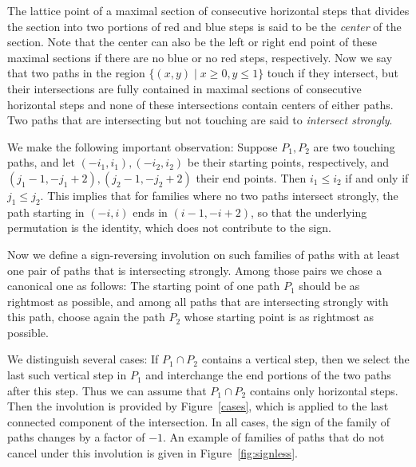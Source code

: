 \documentclass[12pt]{amsart}
\theoremstyle{definition}
\numberwithin{equation}{section}
\begin{document}
The lattice point of a maximal section of consecutive horizontal steps that divides the section into two portions of red and blue steps is said to be the \emph{center} of the section. Note that the center can also be the left or right end point of these maximal sections if there are no blue or no red steps, respectively. Now we say that two paths in the region $\{(x,y) \mid  x \ge 0 , y \le 1\}$ touch if they intersect, but their intersections are fully contained in maximal sections of consecutive horizontal steps and none of these intersections contain centers of either paths. Two paths that are intersecting but not touching are said to \emph{intersect strongly}. 

We make the following important observation: Suppose $P_1,P_2$ are two touching paths, and let 
$(-i_1,i_1),(-i_2,i_2)$ be their starting points, respectively, and $(j_1-1,-j_1+2),(j_2-1,-j_2+2)$ their end points. Then $i_1 \le i_2$ if and only if 
$j_1 \le j_2$. This implies that for families where no two paths intersect strongly, the path starting in 
$(-i,i)$ ends in $(i-1,-i+2)$, so that the underlying permutation is the identity, which does not contribute to the sign.

Now we define a sign-reversing involution on such families of paths with at least one pair of paths that is 
intersecting strongly. Among those pairs we chose a canonical one as follows: The starting point of one path $P_1$ should be as rightmost as possible, and among all paths that are intersecting strongly with this path, choose again the path $P_2$ whose starting point is as rightmost as possible. 

We distinguish several cases: If $P_1 \cap P_2$ contains a vertical step, then we select the last such vertical step in $P_1$ and interchange the end portions of the two paths after this step. Thus we can assume that $P_1 \cap P_2$ contains only horizontal steps. Then the involution is provided by Figure~\ref{cases}, which is applied to the last connected component of the intersection. In all cases, the sign of the family of paths changes by a factor of $-1$.
An example of families of paths that do not cancel under this involution is given in Figure~\ref{fig:signless}.
\end{document}
